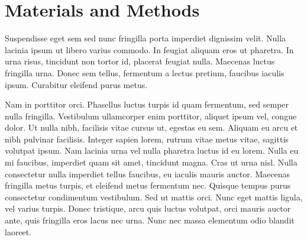 \section{Materials and Methods}


Suspendisse eget sem sed nunc fringilla porta imperdiet dignissim velit. Nulla lacinia ipsum ut libero varius commodo. In feugiat aliquam eros ut pharetra. In urna risus, tincidunt non tortor id, placerat feugiat nulla. Maecenas luctus fringilla urna. Donec sem tellus, fermentum a lectus pretium, faucibus iaculis ipsum. Curabitur eleifend purus metus.

Nam in porttitor orci. Phasellus luctus turpis id quam fermentum, sed semper nulla fringilla. Vestibulum ullamcorper enim porttitor, aliquet ipsum vel, congue dolor. Ut nulla nibh, facilisis vitae cursus ut, egestas eu sem. Aliquam eu arcu et nibh pulvinar facilisis. Integer sapien lorem, rutrum vitae metus vitae, sagittis volutpat ipsum. Nam lacinia urna vel nulla pharetra luctus id eu lorem. Nulla eu mi faucibus, imperdiet quam sit amet, tincidunt magna. Cras ut urna nisl. Nulla consectetur nulla imperdiet tellus faucibus, eu iaculis mauris auctor. Maecenas fringilla metus turpis, et eleifend metus fermentum nec. Quisque tempus purus consectetur condimentum vestibulum. Sed ut mattis orci. Nunc eget mattis ligula, vel varius turpis. Donec tristique, arcu quis luctus volutpat, orci mauris auctor ante, quis fringilla eros lacus nec urna. Nunc nec massa elementum odio blandit laoreet.